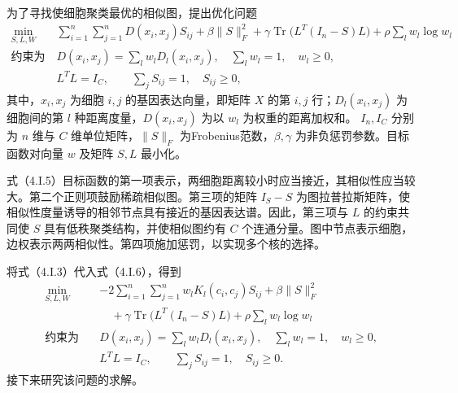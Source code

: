为了寻找使细胞聚类最优的相似图，提出优化问题
\begin{equation}
\begin{aligned}
\min_{S,L,W}\quad
 &\sum_{i=1}^{n}\sum_{j=1}^{n}D(x_i,x_j)S_{ij}
 +\beta\|S\|_F^2+\gamma\operatorname{Tr}\bigl(L^T(I_n-S)L\bigr)
 +\rho\sum_lw_l\log w_l\\
\text{约束为}\quad
 &D(x_i,x_j)=\sum_lw_lD_l(x_i,x_j),\quad
 \sum_lw_l=1,\quad w_l\ge0,\\
 &L^TL=I_C,\qquad\sum_jS_{ij}=1,\quad S_{ij}\ge0,
\end{aligned}\tag{4.I.6}
\end{equation}
其中，$x_i,x_j$ 为细胞 $i,j$ 的基因表达向量，即矩阵 $X$ 的第 $i,j$ 行；$D_l(x_i,x_j)$ 为细胞间的第 $l$ 种距离度量，$D(x_i,x_j)$ 为以 $w_l$ 为权重的距离加权和。
$I_n,I_C$ 分别为 $n$ 维与 $C$ 维单位矩阵，$\|S\|_F$ 为Frobenius范数，$\beta,\gamma$ 为非负惩罚参数。目标函数对向量 $w$ 及矩阵 $S,L$ 最小化。

式（4.I.5）目标函数的第一项表示，两细胞距离较小时应当接近，其相似性应当较大。第二个正则项鼓励稀疏相似图。第三项的矩阵 $I_S-S$ 为图拉普拉斯矩阵，使相似性度量诱导的相邻节点具有接近的基因表达谱。因此，第三项与 $L$ 的约束共同使 $S$ 具有低秩聚类结构，并使相似图约有 $C$ 个连通分量。图中节点表示细胞，边权表示两两相似性。第四项施加惩罚，以实现多个核的选择。

将式（4.I.3）代入式（4.I.6），得到
\begin{equation}
\begin{aligned}
\min_{S,L,W}\quad
 &-2\sum_{i=1}^{n}\sum_{j=1}^{n}w_lK_l(c_i,c_j)S_{ij}
 +\beta\|S\|_F^2\\
 &\quad{}+\gamma\operatorname{Tr}\bigl(L^T(I_n-S)L\bigr)
 +\rho\sum_lw_l\log w_l\\
\text{约束为}\quad
 &D(x_i,x_j)=\sum_lw_lD_l(x_i,x_j),\quad
 \sum_lw_l=1,\quad w_l\ge0,\\
 &L^TL=I_C,\qquad\sum_jS_{ij}=1,\quad S_{ij}\ge0.
\end{aligned}\tag{4.I.7}
\end{equation}
接下来研究该问题的求解。


